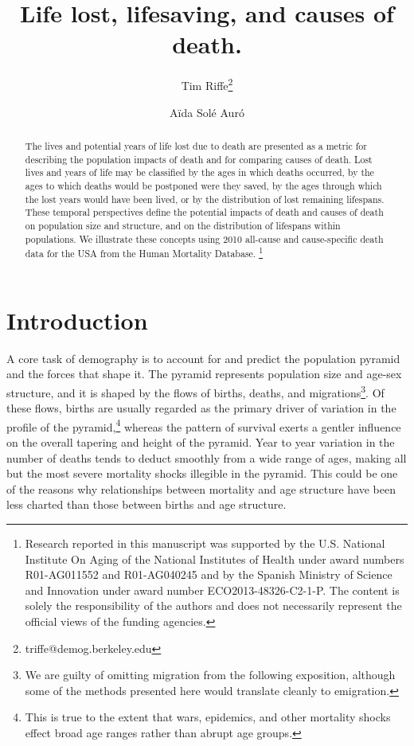 \documentclass{article}
\newcommand\ackn[1]{%
  \begingroup
  \renewcommand\thefootnote{}\footnote{#1}%
  \addtocounter{footnote}{-1}%
  \endgroup
}
\begin{document}
\title{Life lost, lifesaving, and causes of death.}

\author[1]{Tim Riffe\thanks{triffe@demog.berkeley.edu}}
\author[2]{A{\"i}da Sol\'{e} Aur\'{o}}

\maketitle

% 
\begin{abstract}
The lives and potential years of life lost due to death are presented as a metric for describing the population impacts of death and for comparing causes of
death. Lost lives and years of life may be classified by the ages in which
deaths occurred, by the ages to which deaths would be postponed were they saved, by the
ages through which the lost years would have been lived, or by the distribution of
lost remaining lifespans. These temporal perspectives define the
potential impacts of death and causes of death on population size and structure,
and on the distribution of lifespans within populations. We
illustrate these concepts using 2010 all-cause and cause-specific death
data for the USA from the Human Mortality Database. \ackn{Research reported in this manuscript
was supported by the U.S.
National Institute On Aging of the National Institutes of Health under award numbers R01-AG011552 and R01-AG040245 and by the Spanish Ministry of Science and Innovation under award
number ECO2013-48326-C2-1-P. The content is solely the responsibility of the
authors and does not necessarily represent the official views of the funding
agencies.}
\end{abstract}

\section*{Introduction}
A core task of demography is to account for and predict the population
pyramid and the forces that shape it. The pyramid represents population
size and age-sex structure, and it is shaped by the flows of births,
deaths, and migrations\footnote{We are guilty of omitting migration from
the following exposition, although some of the methods presented here would
translate cleanly to emigration.}. Of these flows, births are usually regarded
as the primary driver of variation in the profile of the pyramid,\footnote{This
is true to the extent that wars, epidemics, and other mortality shocks effect
broad age ranges rather than abrupt age groups.} whereas the pattern of survival
exerts a gentler influence on the overall tapering and height of the pyramid.
Year to year variation in the number of deaths tends to deduct
smoothly from a wide range of ages, making all but the most
severe mortality shocks illegible in the pyramid. This could be one of the
reasons why relationships between mortality and age structure have been less charted than those between births and age structure.
\end{document}
